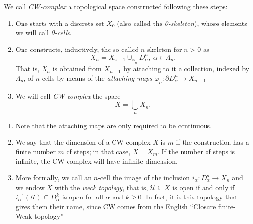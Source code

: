 \begin{definition}
    We call \textit{CW-complex} a topological space constructed following these steps:

        \begin{enumerate}[label=(\roman*)]
            \item One starts with a discrete set $ X_0 $ (also called the \textit{0-skeleton}), whose elements we will call \textit{0-cells}.

            \item One constructs, inductively, the so-called $ n $-skeleton for $n>0$ as
            \begin{equation*}
                X_n = X_{n-1}\cup_{\varphi_{\alpha}}D^n_{\alpha},~\alpha\in \Lambda_n.
            \end{equation*}
            That is, $X_n$ is obtained from $X_{n-1}$ by attaching to it a collection, indexed by $\Lambda_n$, of $n$-cells by means of the \textit{attaching maps} $\varphi_{\alpha} : \partial D^n_{\alpha} \to X_{n-1}$.

            \item We will call \textit{CW-complex} the space
            \begin{equation*}
                X = \bigcup_{n} X_n.
            \end{equation*}
        \end{enumerate}
\end{definition}

\bigskip

\begin{remark} \hfill
    \begin{enumerate}
        \item Note that the attaching maps are only required to be continuous.
        \item We say that the dimension of a CW-complex $X$ is $m$ if the construction has a finite number $m$ of steps; in that case, $X=X_m$. If the number of steps is infinite, the CW-complex will have infinite dimension.
        \item More formally, we call an $n$-cell the image of the inclusion $i_{\alpha}: D^n_{\alpha}\to X_n$ and we endow $X$ with the \textit{weak topology}, that is, $\mathcal{U}\subseteq X$ is open if and only if $i^{-1}_{\alpha}(\mathcal{U})\subseteq D^k_{\alpha}$ is open for all $\alpha$ and $k\ge 0$. In fact, it is this topology that gives them their name, since CW comes from the English ``Closure finite-Weak topology''
    \end{enumerate}
\end{remark}

